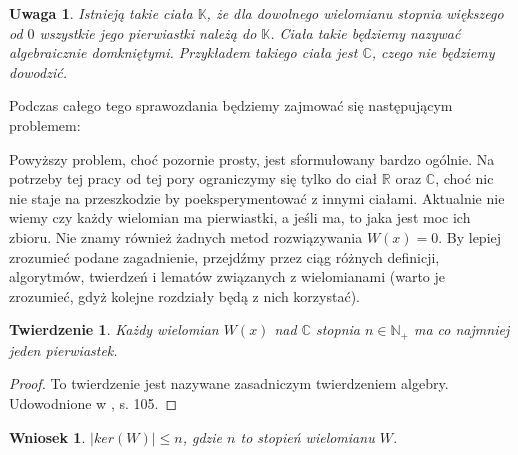 \documentclass{article}
\newtheorem{thm}{Twierdzenie}
\newtheorem{remark}{Uwaga}
\newtheorem{wniosek}{Wniosek}
\begin{document}
\begin{remark}
Istnieją takie ciała $\mathbb{K}$, że dla dowolnego wielomianu stopnia większego od $0$ wszystkie jego pierwiastki należą do $\mathbb{K}$. Ciała takie będziemy nazywać algebraicznie domkniętymi. Przykładem takiego ciała jest $\mathbb{C}$, czego nie będziemy dowodzić. 
\end{remark}

Podczas całego tego sprawozdania będziemy zajmować się następującym problemem:

\begin{center}
\end{center}

Powyższy problem, choć pozornie prosty, jest sformułowany bardzo ogólnie. Na potrzeby tej pracy od tej pory ograniczymy się tylko do ciał $\mathbb{R}$ oraz $\mathbb{C}$, choć nic nie staje na przeszkodzie by poeksperymentować z innymi ciałami. Aktualnie nie wiemy czy każdy wielomian ma pierwiastki, a jeśli ma, to jaka jest moc ich zbioru. Nie znamy również żadnych metod rozwiązywania $W(x) = 0$. By lepiej zrozumieć podane zagadnienie, przejdźmy przez ciąg różnych definicji, algorytmów, twierdzeń i lematów związanych z wielomianami (warto je zrozumieć, gdyż kolejne rozdziały będą z nich korzystać).

\begin{thm}
Każdy wielomian $W(x)$ nad $\mathbb{C}$ stopnia $n \in \mathbb{N}_+$ ma co najmniej jeden pierwiastek.
\end{thm}

\begin{proof}
To twierdzenie jest nazywane zasadniczym twierdzeniem algebry. Udowodnione w \cite{leja}, s. 105.
\end{proof}

\begin{wniosek}
$| ker(W) | \leq n$, gdzie $n$ to stopień wielomianu $W$.	
\end{wniosek}
\end{document}
